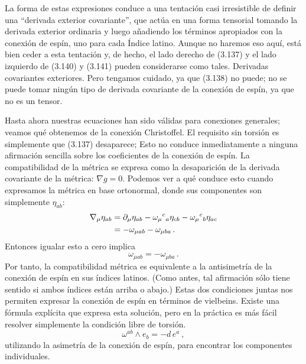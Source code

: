 \documentclass[11pt,b5paper,openany,twoside]{book}
\begin{document}
La forma de estas expresiones conduce a una tentación casi irresistible de definir una ``derivada exterior covariante'', que actúa en una forma tensorial tomando la derivada exterior ordinaria y luego añadiendo los términos apropiados con la conexión de espín, uno para cada Índice latino.
Aunque no haremos eso aquí, está bien ceder a esta tentación y, de hecho, el lado derecho de (3.137) y el lado izquierdo de (3.140) y (3.141) pueden considerarse como tales. Derivadas covariantes exteriores.
Pero tengamos cuidado, ya que (3.138) no puede; no se puede tomar ningún tipo de derivada covariante de la conexión de espín, ya que no es un tensor.

Hasta ahora nuestras ecuaciones han sido válidas para conexiones generales; veamos qué obtenemos de la conexión Christoffel.
El requisito sin torsión es simplemente que (3.137) desaparece; Esto no conduce inmediatamente a ninguna afirmación sencilla sobre los coeficientes de la conexión de espín.
La compatibilidad de la métrica se expresa como la desaparición de la derivada covariante de la métrica: $\nabla g=0$.
Podemos ver a qué conduce esto cuando expresamos la métrica en base ortonormal, donde sus componentes son simplemente $\eta_{ab}$:
\begin{align}
\nabla_\mu \eta_{ab} &= \partial_\mu \eta_{ab}
-\omega_\mu{}^c{}_a \eta_{cb}-\omega_\mu{}^c{}_b \eta_{ac} \notag \\
&= -\omega_{\mu ab}-\omega_{\mu ba}\,. \label{3.142}
\end{align}
Entonces igualar esto a cero implica
\begin{equation}
\omega_{\mu ab}=-\omega_{\mu ba}\,.\label{3.143}
\end{equation}
Por tanto, la compatibilidad métrica es equivalente a la antisimetría de la conexión de espín en sus índices latinos.
(Como antes, tal afirmación sólo tiene sentido si ambos índices están arriba o abajo.)
Estas dos condiciones juntas nos permiten expresar la conexión de espín en términos de vielbeins.
Existe una fórmula explícita que expresa esta solución, pero en la práctica es más fácil resolver simplemente la condición libre de torsión.
\begin{equation}
\omega^{ab}\wedge e_b = - d\,e^a\ ,\label{3.144}
\end{equation}
utilizando la asimetría de la conexión de espín, para encontrar los componentes individuales.
\end{document}
